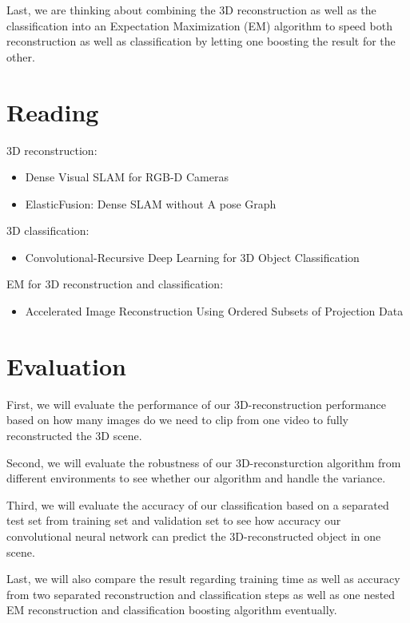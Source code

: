 \documentclass[dvips,12pt]{article}
\begin{document}
Last, we are thinking about combining the 3D reconstruction as well as the classification into an Expectation Maximization (EM) algorithm to speed both reconstruction as well as classification by letting one boosting the result for the other.

\section{Reading}
3D reconstruction:
\begin{itemize}[nolistsep]
\item Dense Visual SLAM for RGB-D Cameras
\item ElasticFusion: Dense SLAM without A pose Graph
\end{itemize}

\noindent 3D classification:
\begin{itemize}[nolistsep]
\item Convolutional-Recursive Deep Learning for 3D Object Classification
\end{itemize}

\noindent EM for 3D reconstruction and classification: 
\begin{itemize}[nolistsep]
\item Accelerated Image Reconstruction Using Ordered Subsets of Projection Data
\end{itemize}


\section{Evaluation}
First, we will evaluate the performance of our 3D-reconstruction performance based on how many images do we need to clip from one video to fully reconstructed the 3D scene.\par

Second, we will evaluate the robustness of our 3D-reconsturction algorithm from different environments to see whether our algorithm and handle the variance.\par

Third, we will evaluate the accuracy of our classification based on a separated test set from training set and validation set to see how accuracy our convolutional neural network can predict the 3D-reconstructed object in one scene.\par

Last, we will also compare the result regarding training time as well as accuracy from two separated reconstruction and classification steps as well as one nested EM reconstruction and classification boosting algorithm eventually.
\end{document}
